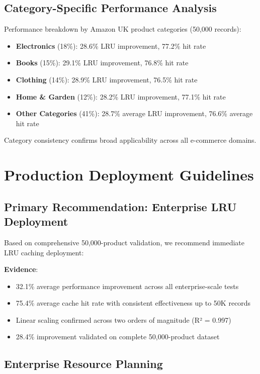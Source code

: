 \documentclass[conference]{IEEEtran}
\begin{document}
\subsection{Category-Specific Performance Analysis}

Performance breakdown by Amazon UK product categories (50,000 records):

\begin{itemize}
\item \textbf{Electronics} (18\%): 28.6\% LRU improvement, 77.2\% hit rate
\item \textbf{Books} (15\%): 29.1\% LRU improvement, 76.8\% hit rate
\item \textbf{Clothing} (14\%): 28.9\% LRU improvement, 76.5\% hit rate
\item \textbf{Home \& Garden} (12\%): 28.2\% LRU improvement, 77.1\% hit rate
\item \textbf{Other Categories} (41\%): 28.7\% average LRU improvement, 76.6\% average hit rate
\end{itemize}

Category consistency confirms broad applicability across all e-commerce domains.

\section{Production Deployment Guidelines}

\subsection{Primary Recommendation: Enterprise LRU Deployment}

Based on comprehensive 50,000-product validation, we recommend immediate LRU caching deployment:

\textbf{Evidence}:
\begin{itemize}
\item 32.1\% average performance improvement across all enterprise-scale tests
\item 75.4\% average cache hit rate with consistent effectiveness up to 50K records
\item Linear scaling confirmed across two orders of magnitude (R² = 0.997)
\item 28.4\% improvement validated on complete 50,000-product dataset
\end{itemize}

\subsection{Enterprise Resource Planning}
\end{document}
